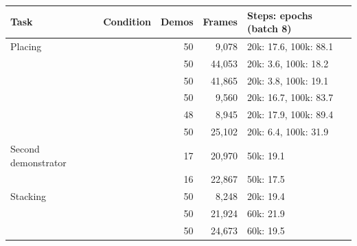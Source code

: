 \begin{tabular}{lrrrl}
\toprule
Task & Condition & Demos & Frames & Steps: epochs (batch 8) \\
\midrule
Placing & \condI{} & 50 & 9,078 & 20k: 17.6, 100k: 88.1 \\
 & \condII{} & 50 & 44,053 & 20k: 3.6, 100k: 18.2 \\
 & \condIII{} & 50 & 41,865 & 20k: 3.8, 100k: 19.1 \\
 & \condVz{} & 50 & 9,560 & 20k: 16.7, 100k: 83.7 \\
 & \condIV{} & 48 & 8,945 & 20k: 17.9, 100k: 89.4 \\
 & \condV{} & 50 & 25,102 & 20k: 6.4, 100k: 31.9 \\
Second demonstrator & \condII{} & 17 & 20,970 & 50k: 19.1 \\
 & \condIII{} & 16 & 22,867 & 50k: 17.5 \\
Stacking & \condI{} & 50 & 8,248 & 20k: 19.4 \\
 & \condII{} & 50 & 21,924 & 60k: 21.9 \\
 & \condIII{} & 50 & 24,673 & 60k: 19.5 \\
\bottomrule
\end{tabular}
